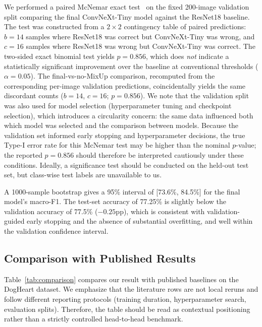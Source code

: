 \documentclass[10pt,twocolumn,letterpaper]{article}
\newcommand{\BestAccuracy}{77.5\%}
\newcommand{\BestTestAccuracy}{77.25\%}
\newcommand{\BestMacroFOneCI}{[73.6\%, 84.5\%]}
\newcommand{\McNemarBaselineP}{0.856}
\newcommand{\McNemarNoMixupP}{0.856}
\begin{document}
We performed a paired McNemar exact test~\cite{mcnemar1947} on the fixed 200-image validation split comparing the final ConvNeXt-Tiny model against the ResNet18 baseline. The test was constructed from a $2 \times 2$ contingency table of paired predictions: $b=14$ samples where ResNet18 was correct but ConvNeXt-Tiny was wrong, and $c=16$ samples where ResNet18 was wrong but ConvNeXt-Tiny was correct. The two-sided exact binomial test yields $p=\McNemarBaselineP$, which does \emph{not} indicate a statistically significant improvement over the baseline at conventional thresholds ($\alpha=0.05$). The final-vs-no-MixUp comparison, recomputed from the corresponding per-image validation predictions, coincidentally yields the same discordant counts ($b=14$, $c=16$; $p=\McNemarNoMixupP$). We note that the validation split was also used for model selection (hyperparameter tuning and checkpoint selection), which introduces a circularity concern: the same data influenced both which model was selected and the comparison between models. Because the validation set informed early stopping and hyperparameter decisions, the true Type-I error rate for this McNemar test may be higher than the nominal $p$-value; the reported $p=\McNemarBaselineP$ should therefore be interpreted cautiously under these conditions. Ideally, a significance test should be conducted on the held-out test set, but class-wise test labels are unavailable to us.

A 1000-sample bootstrap gives a 95\% interval of \BestMacroFOneCI{} for the final model's macro-F1. The test-set accuracy of \BestTestAccuracy{} is slightly below the validation accuracy of \BestAccuracy{} ($-0.25$pp), which is consistent with validation-guided early stopping and the absence of substantial overfitting, and well within the validation confidence interval.

\subsection{Comparison with Published Results}

Table~\ref{tab:comparison} compares our result with published baselines on the DogHeart dataset. We emphasize that the literature rows are not local reruns and follow different reporting protocols (training duration, hyperparameter search, evaluation splits). Therefore, the table should be read as contextual positioning rather than a strictly controlled head-to-head benchmark.
\end{document}
